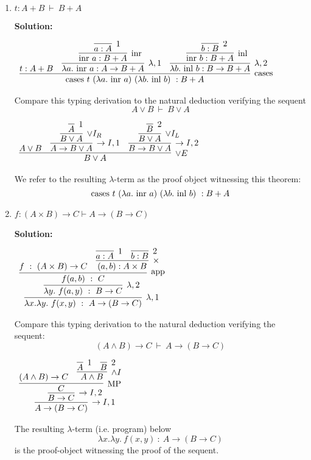 \documentclass[11pt]{report}
\begin{document}
\begin{enumerate}
\begin{enumerate}
		\newpage
		\item $t : A + B \ \vdash \ B + A$ 
		
		{\bf Solution:}
		
		\begin{center}
			$\begin{array}{c}
				\infer[\sumElim]{\sumElim t \ (\lambda a. \ \inr a) \ (\lambda b. \ \inl b) \ : B + A}
					{t : A + B
					&
					\infer[\lambda,1]{\lambda a. \ \inr a : A \to B + A}
						{\infer[\inr]{\inr a : B + A}
							{\infer[1]{a : A}{}}}
					&
					\infer[\lambda,2]{\lambda b. \ \inl b : B \to B + A}
						{\infer[\inl]{\inr b : B + A}
							{\infer[2]{b : B}{}}}}
			\end{array}$		
		\end{center}
		Compare this typing derivation to the natural deduction verifying the sequent
		$$A \lor B \ \vdash \ B \lor A$$
		\begin{center}
			$\begin{array}{c}
				\infer[\lor E]{B \lor A}
					{A \lor B
					&
					\infer[\to I,1]{A \to B \lor A}
						{\infer[\lor I_{R}]{B \lor A}
							{\infer[1]{A}{}}}
					&
					\infer[\to I,2]{B \to B \lor A}
						{\infer[\lor I_{L}]{B \lor A}
							{\infer[2]{B}{}}}}
			\end{array}$		
		\end{center}
		We refer to the resulting $\lambda$-term as the proof object witnessing this theorem:
		$$\text{cases } t \ (\lambda a. \ \text{inr } a) \ (\lambda b. \ \text{inl } b) \ : B + A$$		
		\newpage
		\item $f : (A\times  B) \rightarrow  C \vdash  A\rightarrow ( B \rightarrow  C) $
			
			{\bf Solution:}
				\begin{center}
					$\begin{array}{c}
						\infer[\lambda,1]{\lambda x. \lambda y. \ f(x,y) \ : \ A\to(B\to C)}
							{\infer[\lambda,2]{\lambda y. \ f(a,y) \ : \ B\to C}
								{\infer[\app]{f(a,b) \ : \ C}
									{f \ : \ (A\times B) \to C
									&
									\infer[\times]{(a,b) : A\times B}
										{\infer[1]{a:A}{}
										&
										\infer[2]{b:B}{}}}}}
					\end{array}$
				\end{center}
			Compare this typing derivation to the natural deduction verifying the sequent: 
			$$(A \land B) \rightarrow C \ \vdash \ A \rightarrow (B \rightarrow  C) $$
				\begin{center}
					$\begin{array}{c}
						\infer[\to I,1]{A\to(B\to C)}
							{\infer[\to I,2]{B\to C}
								{\infer[\MP]{C}
									{(A\land B) \to C
									&
									\infer[\land I]{A\land B}
										{\infer[1]{A}{}
										&
										\infer[2]{B}{}}}}}
					\end{array}$
				\end{center}
			The resulting $\lambda$-term (i.e. program) below
			$$ \lambda x. \lambda y. \ f(x,y) \ : \ A\to(B\to C)$$
			is the proof-object witnessing the proof of the sequent.
			

\end{enumerate}
\end{enumerate}
\end{document}
